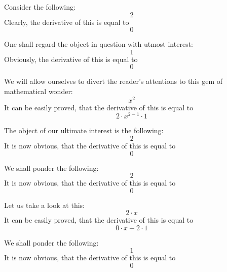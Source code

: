 \documentclass{article}
\begin{document}
Consider the following:
\begin{equation}
2 
\end{equation}
Clearly, the derivative of this is equal to
\begin{equation}
0 
\end{equation}

One shall regard the object in question with utmost interest:
\begin{equation}
1 
\end{equation}
Obviously, the derivative of this is equal to
\begin{equation}
0 
\end{equation}

We will allow ourselves to divert the reader's attentions to this gem of mathematical wonder:
\begin{equation}
x ^{2 } 
\end{equation}
It can be easily proved, that the derivative of this is equal to
\begin{equation}
2 \cdot x ^{2 - 1 } \cdot 1 
\end{equation}

The object of our ultimate interest is the following:
\begin{equation}
2 
\end{equation}
It is now obvious, that the derivative of this is equal to
\begin{equation}
0 
\end{equation}

We shall ponder the following:
\begin{equation}
2 
\end{equation}
It is now obvious, that the derivative of this is equal to
\begin{equation}
0 
\end{equation}

Let us take a look at this:
\begin{equation}
2 \cdot x 
\end{equation}
It can be easily proved, that the derivative of this is equal to
\begin{equation}
0 \cdot x + 2 \cdot 1 
\end{equation}

We shall ponder the following:
\begin{equation}
1 
\end{equation}
It is now obvious, that the derivative of this is equal to
\begin{equation}
0 
\end{equation}
\end{document}
